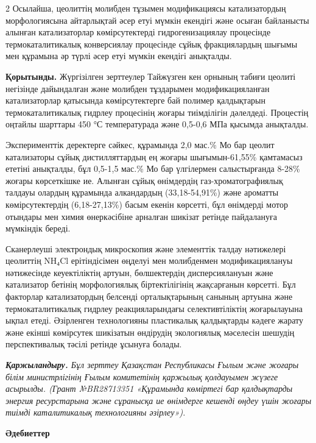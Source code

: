 \begin{multicols}{2}
Осылайша, цеолиттің молибден тұзымен модификациясы катализатордың
морфологиясына айтарлықтай әсер етуі мүмкін екендігі және осыған
байланысты алынған катализаторлар көмірсутектерді гидрогенизациялау
процесінде термокаталитикалық конверсиялау процесінде сұйық
фракциялардың шығымы мен құрамына әр түрлі әсер етуі мүмкін екендігі
анықталды.

{\bfseries Қорытынды.} Жүргізілген зерттеулер Тайжүзген кен орнының табиғи
цеолиті негізінде дайындалған және молибден тұздарымен модификацияланған
катализаторлар қатысында көмірсутектерге бай полимер қалдықтарын
термокаталитикалық гидрлеу процесінің жоғары тиімділігін дәлелдеді.
Процестің оңтайлы шарттары 450 °С температурада және 0,5-0,6 МПа қысымда
анықталды.

Эксперименттік деректерге сәйкес, құрамында 2,0 мас.\% Мо бар цеолит
катализаторы сұйық дистилляттардың ең жоғары шығымын-61,55\% қамтамасыз
ететіні анықталды, бұл 0,5-1,5 мас.\% Мо бар үлгілермен салыстырғанда
8-28\% жоғары көрсеткішке ие. Алынған сұйық өнімдердің
газ-хроматографиялық талдауы олардың құрамында алкандардың
(33,18-54,91\%) және ароматты көмірсутектердің (6,18-27,13\%) басым
екенін көрсетті, бұл өнімдерді мотор отындары мен химия өнеркәсібіне
арналған шикізат ретінде пайдалануға мүмкіндік береді.

Сканерлеуші электрондық микроскопия және элементтік талдау нәтижелері
цеолиттің NH₄Cl ерітіндісімен өңделуі мен молибденмен модификациялануы
нәтижесінде кеуектіліктің артуын, бөлшектердің дисперсиялануын және
катализатор бетінің морфологиялық біртектілігінің жақсарғанын көрсетті.
Бұл факторлар катализатордың белсенді орталықтарының санының артуына
және термокаталитикалық гидрлеу реакцияларындағы селективтіліктің
жоғарылауына ықпал етеді. Әзірленген технологияны пластикалық
қалдықтарды кәдеге жарату және екінші көмірсутек шикізатын өндірудің
экологиялық мәселесін шешудің перспективалық тәсілі ретінде ұсынуға
болады.

\emph{{\bfseries Қаржыландыру.} Бұл зерттеу Қазақстан Республикасы Ғылым
және жоғары білім министрлігінің Ғылым комитетінің қаржылық қолдауымен
жүзеге асырылды. (Грант №BR28713351 «Құрамында көміртегі бар қалдықтарды
энергия ресурстарына және сұранысқа ие өнімдерге кешенді өңдеу үшін
жоғары тиімді каталитикалық технологияны әзірлеу»).}
\end{multicols}

\begin{center}
{\bfseries Әдебиеттер}
\end{center}

